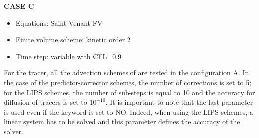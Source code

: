\textbf{CASE C}
\begin{itemize}
 \item Equations: Saint-Venant FV
 \item Finite volume scheme: kinetic order 2
 \item Time step: variable with CFL=0.9
\end{itemize}
For the tracer, all the advection schemes of  are tested in the configuration A.
In the case of the predictor-corrector schemes, the number of corrections is set to 5; for the LIPS schemes, the number of sub-steps is equal to 10 and the accuracy for diffusion of tracers is set to $10^{-10}$. It is important to note that the last parameter is used even if the keyword  is set to NO. Indeed, when using the LIPS schemes, a linear system has to be solved and this parameter defines the accuracy of the solver.
%
%
